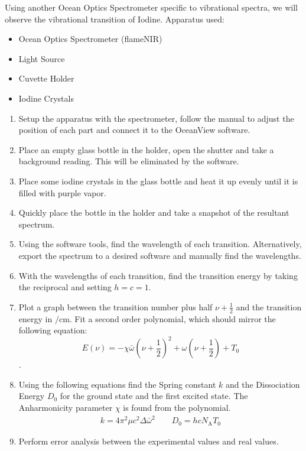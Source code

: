 \documentclass[12pt]{article}
\begin{document}
	Using another Ocean Optics Spectrometer specific to vibrational spectra, we will observe the vibrational transition of Iodine.
	Apparatus used:
	\begin{itemize}
		\item Ocean Optics Spectrometer (flameNIR)
		\item Light Source
		\item Cuvette Holder
		\item Iodine Crystals
	\end{itemize}
	\begin{enumerate}
		\item Setup the apparatus with the spectrometer, follow the manual to adjust the position of each part and connect it to the OceanView software.
		\item Place an empty glass bottle in the holder, open the shutter and take a background reading. This will be eliminated by the software.
		\item Place some iodine crystals in the glass bottle and heat it up evenly until it is filled with purple vapor.
		\item Quickly place the bottle in the holder and take a snapshot of the resultant spectrum.
		\item Using the software tools, find the wavelength of each transition. Alternatively, export the spectrum to a desired software and manually find the wavelengths.
		\item With the wavelengths of each transition, find the transition energy by taking the reciprocal and setting $h=c=1$.
		\item Plot a graph between the transition number plus half $\nu + \frac{1}{2}$ and the transition energy in $\unit{\per\centi\meter}$. Fit a second order polynomial, which should mirror the following equation:
		\[
			E(\nu) = -\chi \bar{\omega}\left( \nu + \frac{1}{2} \right)^2 + \omega \left( \nu +\frac{1}{2} \right) + T_0
		\].
		\item Using the following equations find the Spring constant $k$ and the Dissociation Energy $D_0$ for the ground state and the first excited state. The Anharmonicity parameter $\chi$ is found from the polynomial.
		\begin{equation*}
			\begin{split}
				k = 4 \pi^2 \mu c^2 \Delta \bar{\omega}^2 \qquad D_0 = hc N_\mathrm{A} T_0
			\end{split}
		\end{equation*}
		\item Perform error analysis between the experimental values and real values.
		
		
	\end{enumerate}
\end{document}
